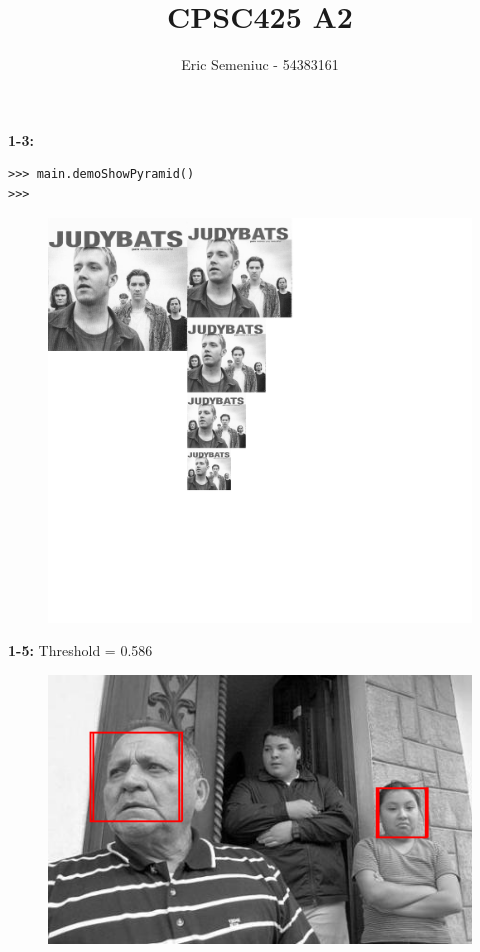 \documentclass[]{article}
\title{CPSC425 A2}
\author{Eric Semeniuc - 54383161}
\begin{document}
\maketitle


\textbf{1-3:}
\begin{verbatim}
>>> main.demoShowPyramid()
>>> 
\end{verbatim}

\begin{figure}[ht]
	\centering
	\includegraphics{pyramid.png}
	\label{fig:pyramid}
\end{figure}


\textbf{1-5:}
Threshold = 0.586\\

\begin{figure}[ht]
\centering
\includegraphics{fam.png}
\label{fig:fam}
\end{figure}
\end{document}
